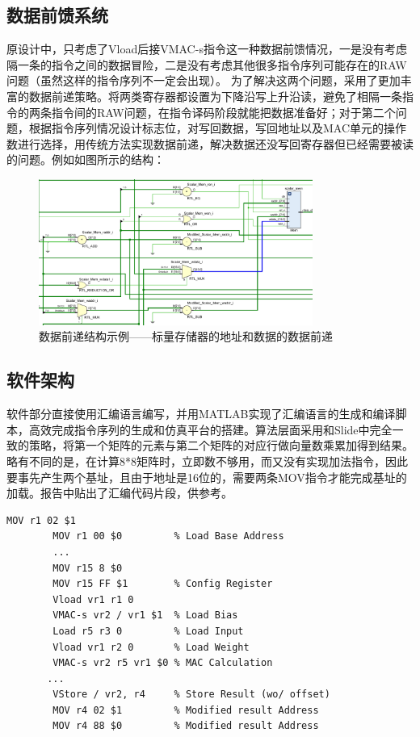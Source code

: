 \documentclass{article}
\begin{document}
    \subsection{数据前馈系统}
    原设计中，只考虑了Vload后接VMAC-s指令这一种数据前馈情况，一是没有考虑隔一条的指令之间的数据冒险，二是没有考虑其他很多指令序列可能存在的RAW问题（虽然这样的指令序列不一定会出现）。
    为了解决这两个问题，采用了更加丰富的数据前递策略。将两类寄存器都设置为下降沿写上升沿读，避免了相隔一条指令的两条指令间的RAW问题，在指令译码阶段就能把数据准备好；对于第二个问题，根据指令序列情况设计标志位，对写回数据，写回地址以及MAC单元的操作数进行选择，用传统方法实现数据前递，解决数据还没写回寄存器但已经需要被读的问题。例如如图所示的结构：
    \begin{figure}[!ht]
        \centering
        \includegraphics[width = 0.8\textwidth]{Forward.png}
        \caption{数据前递结构示例——标量存储器的地址和数据的数据前递}
    \end{figure}

\subsection{软件架构}
    软件部分直接使用汇编语言编写，并用MATLAB实现了汇编语言的生成和编译脚本，高效完成指令序列的生成和仿真平台的搭建。算法层面采用和Slide中完全一致的策略，将第一个矩阵的元素与第二个矩阵的对应行做向量数乘累加得到结果。略有不同的是，在计算8*8矩阵时，立即数不够用，而又没有实现加法指令，因此要事先产生两个基址，且由于地址是16位的，需要两条MOV指令才能完成基址的加载。报告中贴出了汇编代码片段，供参考。

    \begin{lstlisting}[float,frame=lines]
        MOV r1 02 $1
        MOV r1 00 $0         % Load Base Address
        ...
        MOV r15 8 $0         
        MOV r15 FF $1        % Config Register
        Vload vr1 r1 0 
        VMAC-s vr2 / vr1 $1  % Load Bias
        Load r5 r3 0         % Load Input
        Vload vr1 r2 0       % Load Weight
        VMAC-s vr2 r5 vr1 $0 % MAC Calculation
       ...
        VStore / vr2, r4     % Store Result (wo/ offset)
        MOV r4 02 $1         % Modified result Address
        MOV r4 88 $0         % Modified result Address
    \end{lstlisting}
\end{document}
